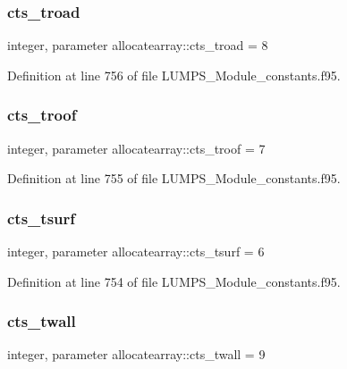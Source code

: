 \subsubsection{\texorpdfstring{cts\+\_\+troad}{cts\_troad}}
{\footnotesize\ttfamily integer, parameter allocatearray\+::cts\+\_\+troad = 8}



Definition at line 756 of file L\+U\+M\+P\+S\+\_\+\+Module\+\_\+constants.\+f95.

\mbox{\label{namespaceallocatearray_afddbb695f2997c5edb8390f3caa3b9fa}} 
\subsubsection{\texorpdfstring{cts\+\_\+troof}{cts\_troof}}
{\footnotesize\ttfamily integer, parameter allocatearray\+::cts\+\_\+troof = 7}



Definition at line 755 of file L\+U\+M\+P\+S\+\_\+\+Module\+\_\+constants.\+f95.

\mbox{\label{namespaceallocatearray_ad02b4cda49767ea25a5e15fb67d4602a}} 
\subsubsection{\texorpdfstring{cts\+\_\+tsurf}{cts\_tsurf}}
{\footnotesize\ttfamily integer, parameter allocatearray\+::cts\+\_\+tsurf = 6}



Definition at line 754 of file L\+U\+M\+P\+S\+\_\+\+Module\+\_\+constants.\+f95.

\mbox{\label{namespaceallocatearray_a2881a82b636f70de7b82aa51e82d6fb0}} 
\subsubsection{\texorpdfstring{cts\+\_\+twall}{cts\_twall}}
{\footnotesize\ttfamily integer, parameter allocatearray\+::cts\+\_\+twall = 9}



